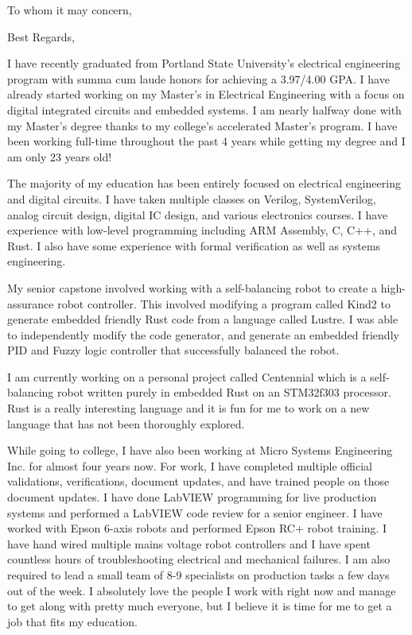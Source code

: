 \documentclass[letterpaper]{moderncv}        %
\begin{document}
    
\recipient{ }{ }
\date{\today}
\opening{To whom it may concern,}
\closing{Best Regards,}
\makelettertitle

I have recently graduated from Portland State University's electrical engineering program with summa cum laude honors for achieving a 3.97/4.00 GPA.  I have already started working on my Master's in Electrical Engineering with a focus on digital integrated circuits and embedded systems.  I am nearly halfway done with my Master's degree thanks to my college's accelerated Master’s program.  I have been working full-time throughout the past 4 years while getting my degree and I am only 23 years old!

The majority of my education has been entirely focused on electrical engineering and digital circuits.  I have taken multiple classes on Verilog, SystemVerilog, analog circuit design, digital IC design, and various electronics courses.  I have experience with low-level programming including ARM Assembly, C, C++, and Rust.  I also have some experience with formal verification as well as systems engineering.

My senior capstone involved working with a self-balancing robot to create a high-assurance robot controller.  This involved modifying a program called Kind2 to generate embedded friendly Rust code from a language called Lustre.  I was able to independently modify the code generator, and generate an embedded friendly PID and Fuzzy logic controller that successfully balanced the robot.

I am currently working on a personal project called Centennial which is a self-balancing robot written purely in embedded Rust on an STM32f303 processor.  Rust is a really interesting language and it is fun for me to work on a new language that has not been thoroughly explored.

While going to college, I have also been working at Micro Systems Engineering Inc. for almost four years now.   For work, I have completed multiple official validations, verifications, document updates, and have trained people on those document updates.  I have done LabVIEW programming for live production systems and performed a LabVIEW code review for a senior engineer.  I have worked with Epson 6-axis robots and performed Epson RC+ robot training.  I have hand wired multiple mains voltage robot controllers and I have spent countless hours of troubleshooting electrical and mechanical failures.  I am also required to lead a small team of 8-9 specialists on production tasks a few days out of the week.  I absolutely love the people I work with right now and manage to get along with pretty much everyone, but I believe it is time for me to get a job that fits my education.


\makeletterclosing
\end{document}
